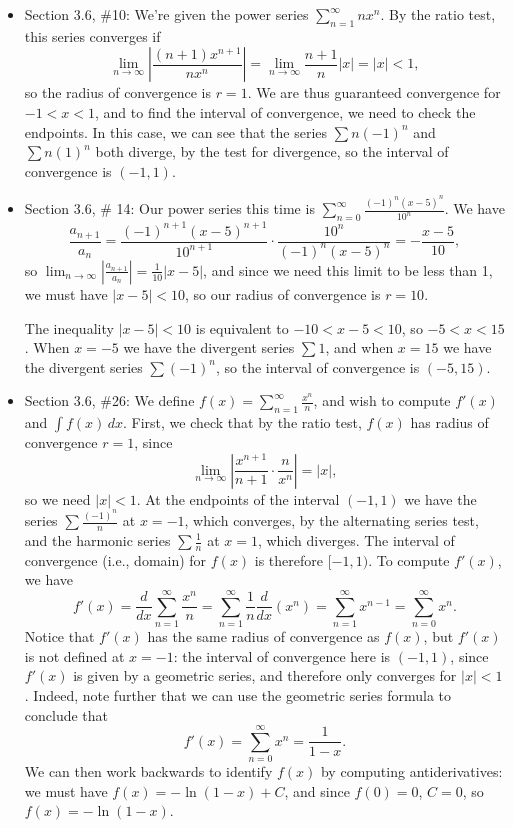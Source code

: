 \documentclass[12pt]{article}
\newcommand{\di}{\displaystyle}
\newcommand{\abs}[1]{\left\lvert #1\right\rvert}
\begin{document}
\begin{itemize}
\item Section 3.6, \#10: We're given the power series $\di \sum_{n=1}^\infty nx^n$. By the ratio test, this series converges if
\[
 \lim_{n\to \infty}\abs{\frac{(n+1)x^{n+1}}{nx^n}} = \lim_{n\to\infty}\frac{n+1}{n}\abs{x} = \abs{x}<1,
\]
so the radius of convergence is $r=1$. We are thus guaranteed convergence for $-1<x<1$, and to find the interval of convergence, we need to check the endpoints. In this case, we can see that the series $\sum n(-1)^n$ and $\sum n(1)^n$ both diverge, by the test for divergence, so the interval of convergence is $(-1,1)$.

\item Section 3.6, \# 14: Our power series this time is $\di \sum_{n=0}^\infty\frac{(-1)^n(x-5)^n}{10^n}$. We have
\[
 \frac{a_{n+1}}{a_n} = \frac{(-1)^{n+1}(x-5)^{n+1}}{10^{n+1}}\cdot \frac{10^n}{(-1)^n(x-5)^n} = -\frac{x-5}{10},
\]
so $\di\lim_{n\to\infty}\abs{\frac{a_{n+1}}{a_n}} = \frac{1}{10}\abs{x-5}$, and since we need this limit to be less than 1, we must have $\abs{x-5}<10$, so our radius of convergence is $r=10$.

The inequality $\abs{x-5}<10$ is equivalent to $-10<x-5<10$, so $-5<x<15$. When $x=-5$ we have the divergent series $\sum 1$, and when $x=15$ we have the divergent series $\sum (-1)^n$, so the interval of convergence is $(-5,15)$.

\item Section 3.6, \#26: We define $\di f(x) = \sum_{n=1}^\infty \frac{x^n}{n}$, and wish to compute $f'(x)$ and $\int f(x)\,dx$. First, we check that by the ratio test, $f(x)$ has radius of convergence $r=1$, since
\[
 \lim_{n\to\infty}\abs{\frac{x^{n+1}}{n+1}\cdot\frac{n}{x^n}} = \abs{x},
\]
so we need $\abs{x}<1$. At the endpoints of the interval $(-1,1)$ we have the series $\di \sum \frac{(-1)^n}{n}$ at $x=-1$, which converges, by the alternating series test, and the harmonic series $\di \sum \frac{1}{n}$ at $x=1$, which diverges. The interval of convergence (i.e., domain) for $f(x)$ is therefore $[-1,1)$. To compute $f'(x)$, we have
\[
 f'(x) = \frac{d}{dx}\sum_{n=1}^\infty \frac{x^n}{n} = \sum_{n=1}^\infty \frac{1}{n}\frac{d}{dx}(x^n) = \sum_{n=1}^\infty x^{n-1} = \sum_{n=0}^\infty x^n.
\]
Notice that $f'(x)$ has the same radius of convergence as $f(x)$, but $f'(x)$ is not defined at $x=-1$: the interval of convergence here is $(-1,1)$, since $f'(x)$ is given by a geometric series, and therefore only converges for $\abs{x}<1$. Indeed, note further that we can use the geometric series formula to conclude that
\[
 f'(x) = \sum_{n=0}^\infty x^n = \frac{1}{1-x}.
\]
We can then work backwards to identify $f(x)$ by computing antiderivatives: we must have $f(x) = -\ln(1-x)+C$, and since $f(0) = 0$, $C=0$, so $f(x) = -\ln(1-x)$.


\end{itemize}
\end{document}
